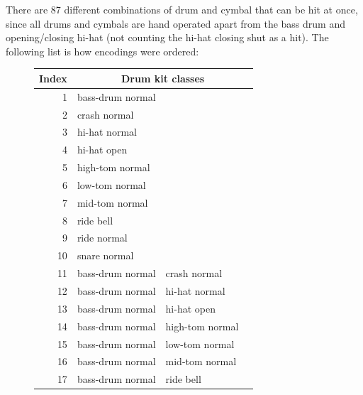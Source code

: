 \begin{appendices}
        There are 87 different combinations of drum and cymbal that can be hit at once, since all drums and cymbals are hand operated apart from the bass drum and opening/closing hi-hat (not counting the hi-hat closing shut as a hit). The following list is how encodings were ordered:
        \begin{figure}[H]
            \centering
            \begin{tiny}
                \begin{tabular}{r|l|l|l|}
                    Index & \multicolumn{3}{c|}{Drum kit classes}\\
                    \hline
                    1 & bass-drum normal & & \\
                    \hline
                    2 & crash normal & & \\
                    \hline
                    3 & hi-hat normal & & \\
                    \hline
                    4 & hi-hat open & & \\
                    \hline
                    5 & high-tom normal & & \\
                    \hline
                    6 & low-tom normal & & \\
                    \hline
                    7 & mid-tom normal & & \\
                    \hline
                    8 & ride bell & & \\
                    \hline
                    9 & ride normal & & \\
                    \hline
                    10 & snare normal & & \\
                    \hline
                    11 & bass-drum normal & crash normal & \\
                    \hline
                    12 & bass-drum normal & hi-hat normal & \\
                    \hline
                    13 & bass-drum normal & hi-hat open & \\
                    \hline
                    14 & bass-drum normal & high-tom normal & \\
                    \hline
                    15 & bass-drum normal & low-tom normal & \\
                    \hline
                    16 & bass-drum normal & mid-tom normal & \\
                    \hline
                    17 & bass-drum normal & ride bell & \\

\end{tabular}
\end{tiny}
\end{figure}
\end{appendices}
